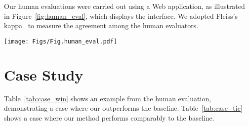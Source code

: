 Our human evaluations were carried out using a Web application, as illustrated in Figure~\ref{fig:human_eval}, which displays the interface. We adopted Fleiss’s kappa~\cite{fleiss1971measuring} to measure the agreement among the human evaluators.


\begin{figure*}[th]
\centering
\texttt{[image: Figs/Fig.human\_eval.pdf]}
\caption{Web interface for human evaluation.}
\label{fig:human_eval}
\end{figure*}



\section{Case Study}
\label{appendix:case}

Table~\ref{tab:case_win} shows an example from the human evaluation, demonstrating a case where our \model outperforms the baseline.  Table~\ref{tab:case_tie} shows a case where our method performs comparably to the baseline.


